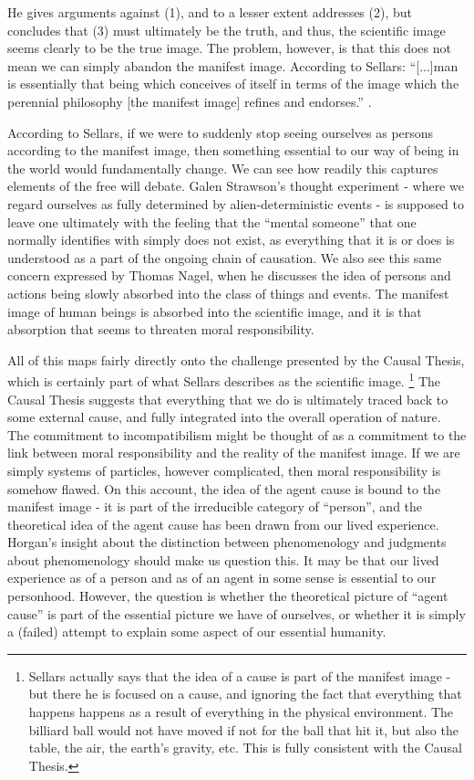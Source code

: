 \documentclass[phd,12pt,oneside,paper=letterpaper]{ubcthesis}
\begin{document}
He gives arguments against (1), and to a lesser extent addresses (2), but concludes that (3) must ultimately be the truth, and thus, the scientific image seems clearly to be the true image. The problem, however, is that this does not mean we can simply abandon the manifest image. According to Sellars:
``[...]man is essentially that being which conceives of itself in terms of the image which the perennial philosophy [the manifest image] refines and endorses.'' \citep[p.495]{sellars1962}.

According to Sellars, if we were to suddenly stop seeing ourselves as persons according to the manifest image, then something essential to our way of being in the world would fundamentally change. We can see how readily this captures elements of the free will debate. Galen Strawson's thought experiment - where we regard ourselves as fully determined by alien-deterministic events - is supposed to leave one ultimately with the feeling that the ``mental someone'' that one normally identifies with simply does not exist, as everything that it is or does is understood as a part of the ongoing chain of causation. We also see this same concern expressed by Thomas Nagel, when he discusses the idea of persons and actions being slowly absorbed into the class of things and events. The manifest image of human beings is absorbed into the scientific image, and it is that absorption that seems to threaten moral responsibility. \citep{nagel1979b}

All of this maps fairly directly onto the challenge presented by the Causal Thesis, which is certainly part of what Sellars describes as the scientific image. \footnote{Sellars actually says that the idea of a cause is part of the manifest image - but there he is focused on a cause, and ignoring the fact that everything that happens happens as a result of everything in the physical environment. The billiard ball would not have moved if not for the ball that hit it, but also the table, the air, the earth's gravity, etc. This is fully consistent with the Causal Thesis.}  The Causal Thesis suggests that everything that we do is ultimately traced back to some external cause, and fully integrated into the overall operation of nature. The commitment to incompatibilism might be thought of as a commitment to the link between moral responsibility and the reality of the manifest image. If we are simply systems of particles, however complicated, then moral responsibility is somehow flawed. On this account, the idea of the agent cause is bound to the manifest image - it is part of the irreducible category of ``person'', and the theoretical idea of the agent cause has been drawn from our lived experience. 
Horgan's insight about the distinction between phenomenology and judgments about phenomenology should make us question this. It may be that our lived experience as of a person and as of an agent in some sense is essential to our personhood. However, the question is whether the theoretical picture of ``agent cause'' is part of the essential picture we have of ourselves, or whether it is simply a (failed) attempt to explain some aspect of our essential humanity. 
\end{document}
